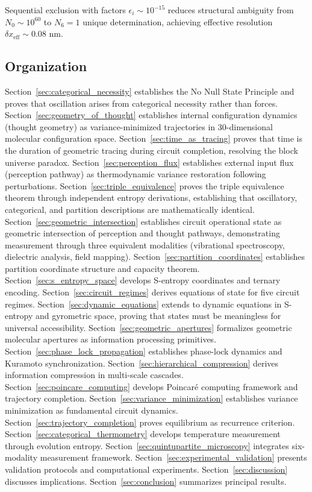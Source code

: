 \documentclass[12pt,a4paper]{article}
\theoremstyle{plain}
\theoremstyle{definition}
\theoremstyle{remark}
\begin{document}
Sequential exclusion with factors $\epsilon_i \sim 10^{-15}$ reduces structural ambiguity from $N_0 \sim 10^{60}$ to $N_6 = 1$ unique determination, achieving effective resolution $\delta x_{\text{eff}} \sim 0.08$ nm.

\subsection{Organization}

Section~\ref{sec:categorical_necessity} establishes the No Null State Principle and proves that oscillation arises from categorical necessity rather than forces. Section~\ref{sec:geometry_of_thought} establishes internal configuration dynamics (thought geometry) as variance-minimized trajectories in 30-dimensional molecular configuration space. Section~\ref{sec:time_as_tracing} proves that time is the duration of geometric tracing during circuit completion, resolving the block universe paradox. Section~\ref{sec:perception_flux} establishes external input flux (perception pathway) as thermodynamic variance restoration following perturbations. Section~\ref{sec:triple_equivalence} proves the triple equivalence theorem through independent entropy derivations, establishing that oscillatory, categorical, and partition descriptions are mathematically identical. Section~\ref{sec:geometric_intersection} establishes circuit operational state as geometric intersection of perception and thought pathways, demonstrating measurement through three equivalent modalities (vibrational spectroscopy, dielectric analysis, field mapping). Section~\ref{sec:partition_coordinates} establishes partition coordinate structure and capacity theorem. Section~\ref{sec:s_entropy_space} develops S-entropy coordinates and ternary encoding. Section~\ref{sec:circuit_regimes} derives equations of state for five circuit regimes. Section~\ref{sec:dynamic_equations} extends to dynamic equations in S-entropy and gyrometric space, proving that states must be meaningless for universal accessibility. Section~\ref{sec:geometric_apertures} formalizes geometric molecular apertures as information processing primitives. Section~\ref{sec:phase_lock_propagation} establishes phase-lock dynamics and Kuramoto synchronization. Section~\ref{sec:hierarchical_compression} derives information compression in multi-scale cascades. Section~\ref{sec:poincare_computing} develops Poincaré computing framework and trajectory completion. Section~\ref{sec:variance_minimization} establishes variance minimization as fundamental circuit dynamics. Section~\ref{sec:trajectory_completion} proves equilibrium as recurrence criterion. Section~\ref{sec:categorical_thermometry} develops temperature measurement through evolution entropy. Section~\ref{sec:quintupartite_microscopy} integrates six-modality measurement framework. Section~\ref{sec:experimental_validation} presents validation protocols and computational experiments. Section~\ref{sec:discussion} discusses implications. Section~\ref{sec:conclusion} summarizes principal results.
\end{document}
